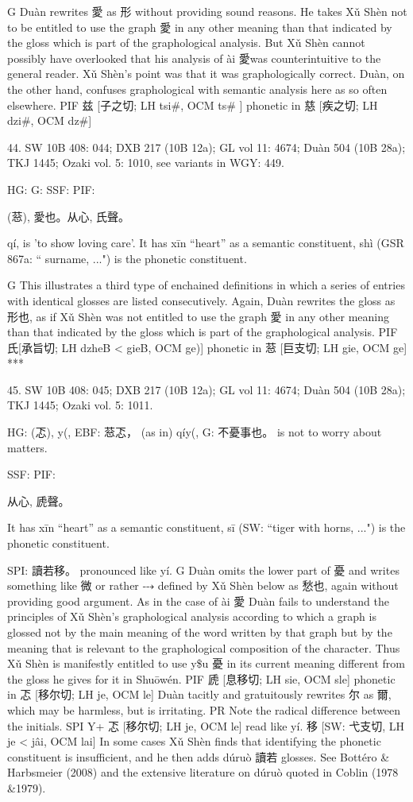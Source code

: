 G  Duàn rewrites 愛 as 形 without providing sound reasons. He takes Xǔ Shèn not to be entitled to use the graph 愛 in any other meaning than that indicated by the gloss which is part of the graphological analysis. But Xǔ Shèn cannot possibly have overlooked that his analysis of ài 愛was counterintuitive to the general reader. Xǔ Shèn's point was that it was graphologically correct. Duàn, on the other hand, confuses graphological with semantic analysis here as so often elsewhere.
PIF   兹 [子之切; LH tsi\#, OCM ts\# ] phonetic in 慈 [疾之切; LH dzi\#, OCM dz\#]

44. SW 10B 408: 044; DXB 217 (10B 12a); GL vol 11: 4674; Duàn 504 (10B 28a); TKJ 1445; Ozaki vol. 5: 1010, see
variants in WGY: 449.


HG:
G: SSF: PIF:

  (䓗),
愛也。从心, 氏聲。


qí,
is 'to show loving care'.
It has xīn ``heart'' as a semantic constituent,
shì (GSR 867a: `` surname, ...") is the phonetic constituent.

G	This illustrates a third type of enchained definitions in which a series of entries with identical glosses are listed consecutively.
Again, Duàn rewrites the gloss as 形也, as if Xǔ Shèn was not entitled to use the graph 愛 in
any other meaning than that indicated by the gloss which is part of the graphological analysis.
PIF     氏[承旨切; LH dzheB < gieB, OCM ge)] phonetic in 䓗 [巨支切; LH gie, OCM ge]
***

45. SW 10B 408: 045; DXB 217 (10B 12a); GL vol 11: 4674; Duàn 504 (10B 28a); TKJ 1445; Ozaki vol. 5: 1011.

HG:	(忑),	y(,
EBF:   䓗忑，	(as in) qíy(,
G:	不憂事也。 is not to worry about matters.

SSF: PIF:

从心, 虒聲。

It has xīn ``heart'' as a semantic constituent,
sī (SW: ``tiger with horns, ...") is the phonetic constituent.



SPI:   讀若移。 pronounced like yí.
G   Duàn omits the lower part of 憂 and writes something like 微 or rather ⤏ defined by Xǔ Shèn below as 愁也, again without providing good argument. As in the case of ài 愛 Duàn fails to understand the principles of Xǔ Shèn's graphological analysis according to which a graph is glossed not by the main meaning of the word written by that graph but by the meaning that is relevant to the graphological composition of the character. Thus Xǔ Shèn is manifestly entitled to use y\$u 憂 in its current meaning different from the gloss he gives for it in Shuōwén.
PIF 虒 [息移切; LH sie, OCM sle] phonetic in 忑 [移尔切; LH je, OCM le] Duàn tacitly and gratuitously rewrites 尔 as 爾, which may be harmless, but is irritating.
PR   Note the radical difference between the initials.
SPI      Y+ 忑 [移尔切; LH je, OCM le] read like yí. 移 [SW: 弋支切, LH je < jâi, OCM lai]
    In some cases Xǔ Shèn finds that identifying the phonetic constituent is insufficient, and he then adds dúruò 讀若 glosses. See Bottéro & Harbsmeier (2008) and the extensive literature on dúruò quoted in Coblin (1978 &1979).


